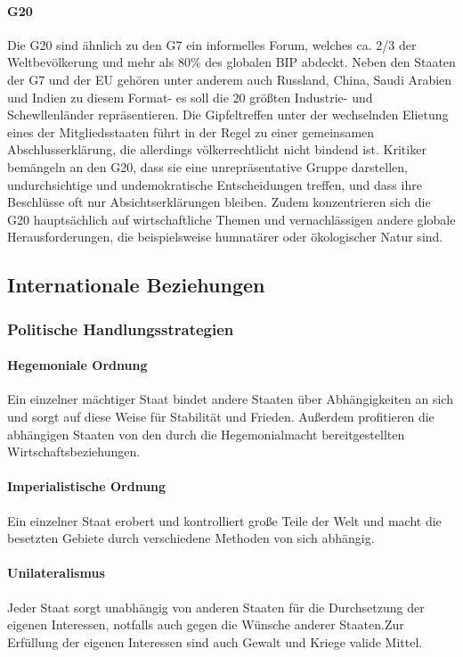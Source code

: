 \documentclass{article}
\begin{document}
	\paragraph{G20}
	Die G20 sind ähnlich zu den G7 ein informelles Forum, welches ca. 2/3 der Weltbevölkerung und mehr als 80\% des globalen BIP abdeckt. Neben den Staaten der G7 und der EU gehören unter anderem auch Russland, China, Saudi Arabien und Indien zu diesem Format- es soll die 20 größten Industrie- und Schewllenländer repräsentieren. Die Gipfeltreffen unter der wechselnden Elietung eines der Mitgliedsstaaten führt in der Regel zu einer gemeinsamen Abschlusserklärung, die allerdings völkerrechtlicht nicht bindend ist. Kritiker bemängeln an den G20, dass sie eine unrepräsentative Gruppe darstellen, undurchsichtige und undemokratische Entscheidungen treffen, und dass ihre Beschlüsse oft nur Absichtserklärungen bleiben. Zudem konzentrieren sich die G20 hauptsächlich auf wirtschaftliche Themen und vernachlässigen andere globale Herausforderungen, die beispielsweise humnatärer oder ökologischer Natur sind.


	\subsection{Internationale Beziehungen}

	\subsubsection{Politische Handlungsstrategien}

	\paragraph{Hegemoniale Ordnung}
	Ein einzelner mächtiger Staat bindet andere Staaten über Abhängigkeiten an sich und sorgt auf diese Weise für Stabilität und Frieden. Außerdem profitieren die abhängigen Staaten von den durch die Hegemonialmacht bereitgestellten Wirtschaftsbeziehungen.

	\paragraph{Imperialistische Ordnung}
	Ein einzelner Staat erobert und kontrolliert große Teile der Welt und macht die besetzten Gebiete durch verschiedene Methoden von sich abhängig.

	\paragraph{Unilateralismus}
	Jeder Staat sorgt unabhängig von anderen Staaten für die Durchsetzung der eigenen Interessen, notfalls auch gegen die Wünsche anderer Staaten.Zur Erfüllung der eigenen Interessen sind auch Gewalt und Kriege valide Mittel.
\end{document}
